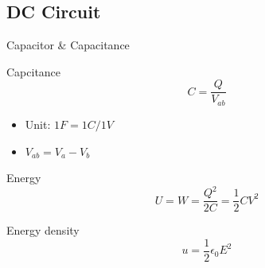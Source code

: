 \documentclass{beamer}
\begin{document}
\subsection{DC Circuit}

\begin{frame}{Capacitor \& Capacitance}
    \begin{beamerboxesrounded}[shadow=true]{Capcitance}
        \begin{equation}
            C = \frac{Q}{V_{ab}}
        \end{equation}
    \end{beamerboxesrounded}
    \begin{itemize}
        \item Unit: $1F = 1C/1V$
        \item $V_{ab} = V_a - V_b$
    \end{itemize}

    \begin{beamerboxesrounded}[shadow = true]{Energy}
        \begin{equation}
            U = W = \frac{Q^2}{2C} = \frac{1}{2} CV^2 
        \end{equation}
    \end{beamerboxesrounded}

    \begin{block}{Energy density}
        \begin{equation}
            u = \frac{1}{2} \epsilon_0 E^2
        \end{equation}
    \end{block}     
\end{frame}
\end{document}
